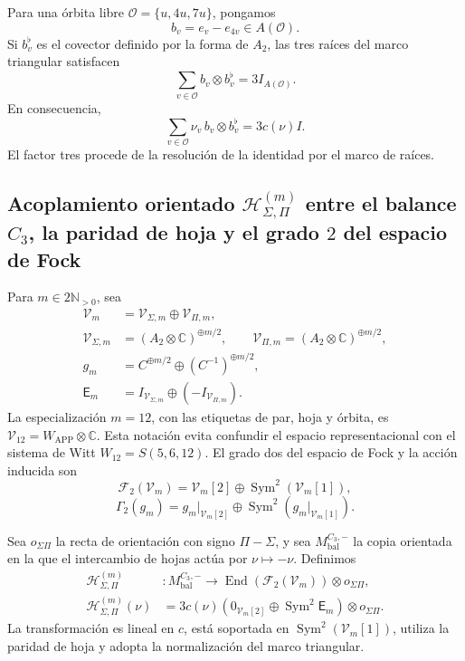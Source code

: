 Para una órbita libre
\(\mathcal O=\{u,4u,7u\}\), pongamos
\[
b_v=e_v-e_{4v}\in A(\mathcal O).
\]
Si \(b_v^\flat\) es el covector definido por la forma de \(A_2\), las tres
raíces del marco triangular satisfacen
\[
\boxed{
\sum_{v\in\mathcal O}b_v\otimes b_v^\flat
=3I_{A(\mathcal O)}.}
\]
En consecuencia,
\[
\sum_{v\in\mathcal O}\nu_v\,b_v\otimes b_v^\flat
=3c(\nu)I.
\]
El factor tres procede de la resolución de la identidad por el marco de
raíces.

\subsection{Acoplamiento orientado \(\mathcal H_{\Sigma,\Pi}^{(m)}\) entre el balance \(C_3\), la paridad de hoja y el grado \(2\) del espacio de Fock}

Para \(m\in2\mathbb N_{>0}\), sea
\[
\begin{aligned}
\mathcal V_m&=\mathcal V_{\Sigma,m}\oplus\mathcal V_{\Pi,m},\\
\mathcal V_{\Sigma,m}&=(A_2\otimes\mathbb C)^{\oplus m/2},\qquad
\mathcal V_{\Pi,m}=(A_2\otimes\mathbb C)^{\oplus m/2},\\
g_m&=C^{\oplus m/2}\oplus(C^{-1})^{\oplus m/2},\\
\mathsf E_m&=I_{\mathcal V_{\Sigma,m}}
\oplus(-I_{\mathcal V_{\Pi,m}}).
\end{aligned}
\]
La especialización \(m=12\), con las etiquetas de par, hoja y órbita,
es \(\mathcal V_{12}=W_{\mathrm{APP}}\otimes\mathbb C\). Esta notación
evita confundir el espacio representacional con el sistema de Witt
\(W_{12}=S(5,6,12)\). El grado dos del espacio de
Fock y la acción inducida son
\[
\mathcal F_2(\mathcal V_m)
=\mathcal V_m[2]\oplus\operatorname{Sym}^2(\mathcal V_m[1]),
\]
\[
\Gamma_2(g_m)
=g_m|_{\mathcal V_m[2]}
\oplus\operatorname{Sym}^2(g_m|_{\mathcal V_m[1]}).
\]

Sea \(o_{\Sigma\Pi}\) la recta de orientación con signo
\(\Pi-\Sigma\), y sea \(M_{\mathrm{bal}}^{C_3,-}\) la copia orientada en
la que el intercambio de hojas actúa por \(\nu\mapsto-\nu\). Definimos
\[
\boxed{
\begin{aligned}
\mathcal H_{\Sigma,\Pi}^{(m)}&:
M_{\mathrm{bal}}^{C_3,-}\longrightarrow
\operatorname{End}(\mathcal F_2(\mathcal V_m))\otimes o_{\Sigma\Pi},\\
\mathcal H_{\Sigma,\Pi}^{(m)}(\nu)
&=3c(\nu)
\left(0_{\mathcal V_m[2]}\oplus\operatorname{Sym}^2\mathsf E_m\right)
\otimes o_{\Sigma\Pi}.
\end{aligned}}
\]
La transformación es lineal en \(c\), está soportada en
\(\operatorname{Sym}^2(\mathcal V_m[1])\), utiliza la paridad de hoja y adopta la
normalización del marco triangular.

